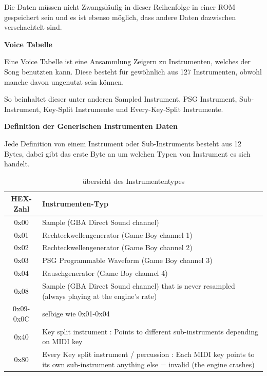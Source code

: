 \documentclass[11pt,a4paper]{scrartcl}
\newcommand{\paratitle}[1] {
    \vspace{5mm}
    \large \textbf{#1} \normalsize
    \vspace{2mm}\newline
}
\begin{document}
Die Daten m\"ussen nicht Zwangsl\"aufig in dieser Reihenfolge in einer ROM gespeichert sein und es ist ebenso m\"oglich, dass andere Daten dazwischen verschachtelt sind.

\vspace{15pt}
\textbf{{\large Voice Tabelle}}

Eine Voice Tabelle ist eine Ansammlung Zeigern zu Instrumenten, welches der Song benutzten kann. Diese besteht f\"ur gew\"ohnlich aus 127 Instrumenten, obwohl manche davon ungenutzt sein k\"onnen. 

So beinhaltet dieser unter anderen Sampled Instrument, PSG Instrument, Sub-Instrument, Key-Split Instrumente und Every-Key-Split Instrumente.

\newpage
\paratitle{Definition der Generischen Instrumenten Daten}
Jede Definition von einem Instrument oder Sub-Instruments besteht aus 12 Bytes, dabei gibt das erste Byte an um welchen Typen von Instrument es sich handelt.

\begin{table}[h]
    \centering
    \begin{tabular}{ c | p{15cm} }
        \textbf{HEX-Zahl} & \textbf{Instrumenten-Typ} \\
        \hline
        0x00 & Sample (GBA Direct Sound channel) \\
        \hline
        0x01 & Rechteckwellengenerator (Game Boy channel 1) \\
        \hline
        0x02 & Rechteckwellengenerator (Game Boy channel 2) \\
        \hline
        0x03 & PSG Programmable Waveform (Game Boy channel 3) \\
        \hline
        0x04 & Rauschgenerator (Game Boy channel 4) \\
        \hline
        0x08 & Sample (GBA Direct Sound channel) that is never resampled (always playing at the engine's rate) \\
				\hline
        0x09-0x0C & selbige wie 0x01-0x04\\
				\hline
        0x40 & Key split instrument  : Points to different sub-instruments depending on MIDI key \\
				\hline
        0x80 & Every Key split instrument / percussion : Each MIDI key points to its own sub-instrument anything else = invalid (the engine crashes) \\
    \end{tabular}
    \caption{\"ubersicht des Instrumententypes}
    \label{table:InstrumentenTyp}
\end{table}
\end{document}
